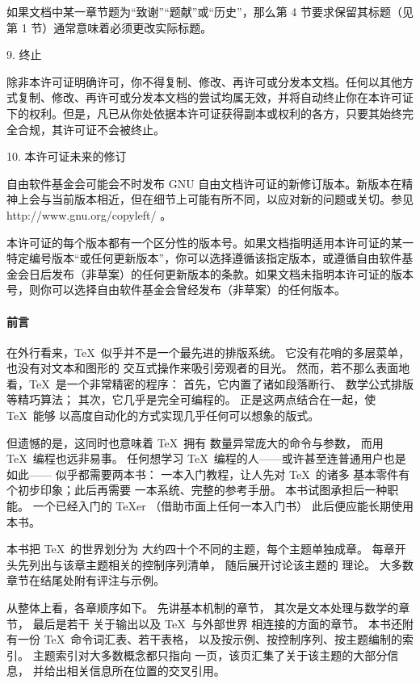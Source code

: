 \documentclass[a4paper]{rapport3}
\begin{document}
如果文档中某一章节题为“致谢”“题献”或“历史”，那么第 4 节要求保留其标题（见第 1 节）通常意味着必须更改实际标题。

9. 终止

除非本许可证明确许可，你不得复制、修改、再许可或分发本文档。任何以其他方式复制、修改、再许可或分发本文档的尝试均属无效，并将自动终止你在本许可证下的权利。但是，凡已从你处依据本许可证获得副本或权利的各方，只要其始终完全合规，其许可证不会被终止。

10. 本许可证未来的修订

自由软件基金会可能会不时发布 GNU 自由文档许可证的新修订版本。新版本在精神上会与当前版本相近，但在细节上可能有所不同，以应对新的问题或关切。参见 http://www.gnu.org/copyleft/ 。

本许可证的每个版本都有一个区分性的版本号。如果文档指明适用本许可证的某一特定编号版本“或任何更新版本”，你可以选择遵循该指定版本，或遵循自由软件基金会日后发布（非草案）的任何更新版本的条款。如果文档未指明本许可证的版本号，则你可以选择自由软件基金会曾经发布（非草案）的任何版本。

\pagebreak
\paragraph*{\bf 前言}
在外行看来，\TeX\
似乎并不是一个最先进的排版系统。
它没有花哨的多层菜单，也没有对文本和图形的
交互式操作来吸引旁观者的目光。
然而，若不那么表面地看，\TeX\ 是一个非常精密的程序：
首先，它内置了诸如段落断行、
数学公式排版等精巧算法；
其次，它几乎是完全可编程的。
正是这两点结合在一起，使 \TeX\ 能够
以高度自动化的方式实现几乎任何可以想象的版式。

但遗憾的是，这同时也意味着 \TeX\ 拥有
数量异常庞大的命令与参数，
而用 \TeX\ 编程也远非易事。
任何想学习 \TeX\ 编程的人——或许甚至连普通用户也是如此——
似乎都需要两本书：
一本入门教程，让人先对 \TeX\ 的诸多
基本零件有个初步印象；此后再需要
一本系统、完整的参考手册。
本书试图承担后一种职能。
一个已经入门的 \TeX er
（借助市面上任何一本入门书）
此后便应能长期使用本书。

本书把 \TeX\ 的世界划分为
大约四十个不同的主题，每个主题单独成章。
每章开头先列出与该章主题相关的控制序列清单，
随后展开讨论该主题的
理论。
大多数章节在结尾处附有评注与示例。

从整体上看，各章顺序如下。
先讲基本机制的章节，
其次是文本处理与数学的章节，
最后是若干
关于输出以及 \TeX\ 与外部世界
相连接的方面的章节。
%
本书还附有一份 \TeX\
命令词汇表、若干表格，
以及按示例、按控制序列、按主题编制的索引。
主题索引对大多数概念都只指向
一页，该页汇集了关于该主题的大部分信息，
并给出相关信息所在位置的交叉引用。
\end{document}
